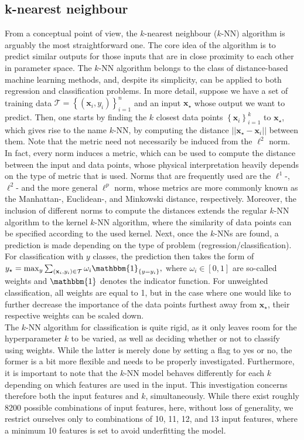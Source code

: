 \documentclass{article}
\begin{document}
\subsection{k-nearest neighbour}
From a conceptual point of view, the $k$-nearest neighbour ($k$-NN) algorithm is arguably the most straightforward one. The core idea of the algorithm is to predict similar outputs for those inputs that are in close proximity to each other in parameter space. The $k$-NN algorithm belongs to the class of distance-based machine learning methods, and, despite its simplicity, can be applied to both regression and classification problems. In more detail, suppose we have a set of training data $\mathcal{T}=\left\{(\mathbf{x}_i,y_i)\right\}_{i=1}^n$ and an input $\mathbf{x_{\star}}$ whose output we want to predict. Then, one starts by finding the $k$ closest data points $\left\{\mathbf{x}_i\right\}_{i=1}^k$ to $\mathbf{x_{\star}}$, which gives rise to the name $k$-NN, by computing the distance $||\mathbf{x_{\star}}-\mathbf{x}_i||$ between them. Note that the metric need not necessarily be induced from the $\ell^2$ norm. In fact, every norm induces a metric, which can be used to compute the distance between the input and data points, whose physical interpretation heavily depends on the type of metric that is used. Norms that are frequently used are the $\ell^1$-, $\ell^2$- and the more general $\ell^p$ norm, whose metrics are more commonly known as the Manhattan-, Euclidean-, and Minkowski distance, respectively. Moreover, the inclusion of different norms to compute the distances extends the regular $k$-NN algorithm to the kernel $k$-NN algorithm, where the similarity of data points can be specified according to the used kernel\cite{yu2002kernel}.
Next, once the $k$-NNs are found, a prediction is made depending on the type of problem (regression/classification). For classification with $y$ classes, the prediction then takes the form of $ y_{\mathbf{\star}}=\max_{y} \sum_{(\mathbf{x}_i,y_i)\in\mathcal{T}} \omega_i \mathbbm{1}_{\left\{y=y_i\right\}},$ where $\omega_i\in[0,1]$ are so-called weights and $\mathbbm{1}$ denotes the indicator function. For unweighted classification, all weights are equal to 1, but in the case where one would like to further decrease the importance of the data points furthest away from $\mathbf{x_{\star}}$, their respective weights can be scaled down.\\

\noindent The $k$-NN algorithm for classification is quite rigid, as it only leaves room for the hyperparameter $k$ to be varied, as well as deciding whether or not to classify using weights. While the latter is merely done by setting a flag to yes or no, the former is a bit more flexible and needs to be properly investigated. Furthermore, it is important to note that the $k$-NN model behaves differently for each $k$ depending on which features are used in the input. This investigation concerns therefore both the input features and $k$, simultaneously. While there exist roughly 8200 possible combinations of input features, here, without loss of generality, we restrict ourselves only to combinations of 10, 11, 12, and 13 input features, where a minimum 10 features is set to avoid underfitting the model.\\
\end{document}
